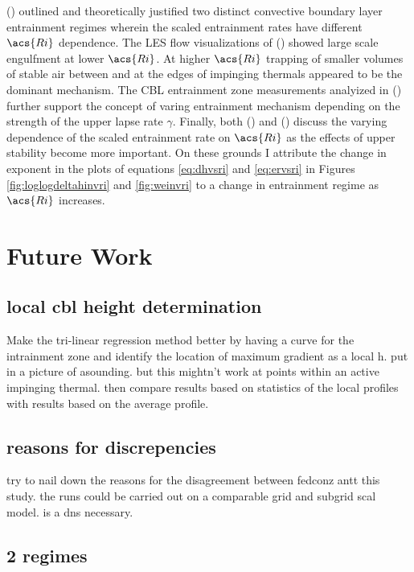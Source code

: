 \citeauthor{Turner86} (\citeyear{Turner86}) outlined and theoretically justified two distinct convective boundary layer entrainment regimes wherein the scaled entrainment rates have different $\acs{Ri}$ dependence. The \acs{LES} flow visualizations of \citeauthor{SullMoengStev} (\citeyear{SullMoengStev}) showed large scale engulfment at lower $\acs{Ri}$.  At higher $\acs{Ri}$ trapping of smaller volumes of stable air between and at the edges of impinging thermals appeared to be the dominant mechanism. The \acs{CBL} entrainment zone measurements analyized in \citeauthor{Traum11} (\citeyear{Traum11}) further support the concept of varing entrainment mechanism depending on the strength of the upper lapse rate $\gamma$.  Finally, both \citeauthor{FedConzMir04} (\citeyear{FedConzMir04})  and \citeauthor{GarciaMellado} (\citeyear{GarciaMellado}) discuss the varying dependence of the scaled entrainment rate on $\acs{Ri}$ as the effects of upper stability become more important.  On these grounds I attribute the change in exponent in the plots of equations \ref{eq:dhvsri} and \ref{eq:ervsri} in Figures \ref{fig:loglogdeltahinvri} and \ref{fig:weinvri} to a change in entrainment regime as $\acs{Ri}$ increases.   


\section{Future Work}
\subsection{local cbl height determination}
Make the tri-linear regression method better by having a curve for the intrainment zone and identify the location of maximum gradient as a local h.  put in a picture of  asounding.  but this mightn't work at points within an active impinging thermal.  then compare results based on statistics of the local profiles with results based on the average profile.\\

\subsection{reasons for discrepencies}
try to nail down the reasons for the disagreement between fedconz antt this study.  the runs could be carried out on a comparable grid and subgrid scal model. is a dns necessary. \\

\subsection{2 regimes}

